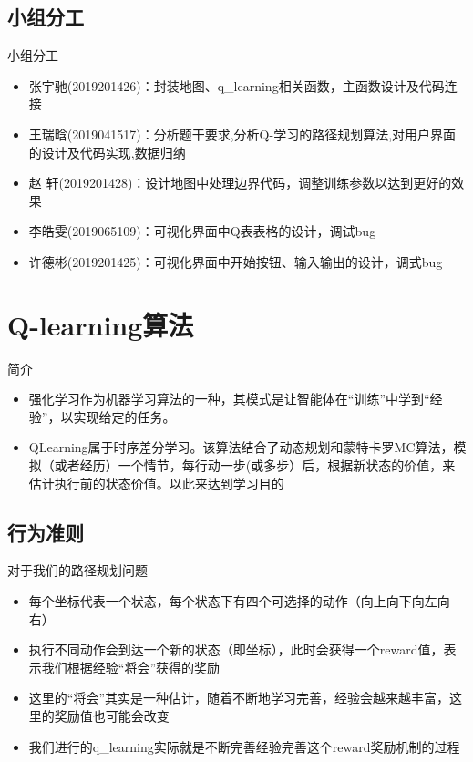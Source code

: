 \documentclass{beamer}
\begin{document}
\subsection{小组分工}
\begin{frame}{小组分工}
    \begin{itemize}
        \tiny
        \item 张宇驰(2019201426)：封装地图、q\_learning相关函数，主函数设计及代码连接
        \item 王瑞晗(2019041517)：分析题干要求,分析Q-学习的路径规划算法,对用户界面的设计及代码实现,数据归纳
        \item 赵  轩(2019201428)：设计地图中处理边界代码，调整训练参数以达到更好的效果
        \item 李皓雯(2019065109)：可视化界面中Q表表格的设计，调试bug
        \item 许德彬(2019201425)：可视化界面中开始按钮、输入输出的设计，调式bug
    \end{itemize}
\end{frame}



\section{Q-learning算法}
\begin{frame}{简介}

    \begin{itemize}[<+-| alert@+>]
        
        
        \item 强化学习作为机器学习算法的一种，其模式是让智能体在“训练”中学到“经验”，以实现给定的任务。
        
        \item QLearning属于时序差分学习。该算法结合了动态规划和蒙特卡罗MC算法，模拟（或者经历）一个情节，每行动一步(或多步）后，根据新状态的价值，来估计执行前的状态价值。以此来达到学习目的
    \end{itemize}
\end{frame}

\subsection{行为准则}

\begin{frame}{对于我们的路径规划问题}
    \begin{itemize}
         
        
        \item 每个坐标代表一个状态，每个状态下有四个可选择的动作（向上向下向左向右）
        
        \item 执行不同动作会到达一个新的状态（即坐标），此时会获得一个reward值，表示我们根据经验“将会”获得的奖励
        
        \item 这里的“将会”其实是一种估计，随着不断地学习完善，经验会越来越丰富，这里的奖励值也可能会改变
        
        \item 我们进行的q\_learning实际就是不断完善经验完善这个reward奖励机制的过程
    \end{itemize}
\end{frame}
\end{document}
